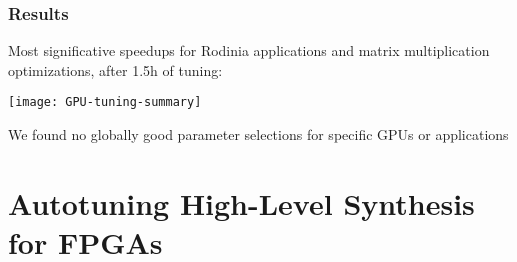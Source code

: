 \documentclass[10pt, compress, aspectratio=169]{beamer}
\begin{document}
%

\begin{frame}
    \frametitle{Results}
    \alert{Most significative speedups} for \alert{Rodinia applications}
    and \alert{matrix multiplication optimizations}, after \alert{1.5h of tuning}:

    \begin{center}
        \texttt{[image: GPU-tuning-summary]}
    \end{center}

    We \alert{found no globally good parameter selections} for specific GPUs or applications
\end{frame}

\section{Autotuning High-Level Synthesis for FPGAs}

%
\end{document}
